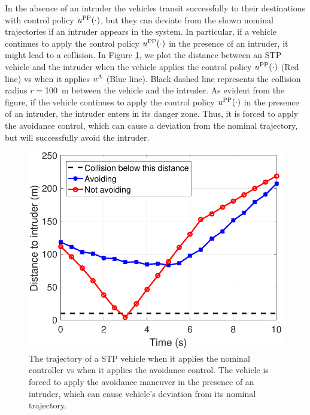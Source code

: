 In the absence of an intruder the vehicles transit successfully to their destinations with control policy $u^{\text{PP}}(\cdot)$, but they can deviate from the shown nominal trajectories if an intruder appears in the system. In particular, if a vehicle continues to apply the control policy $u^{\text{PP}}(\cdot)$ in the presence of an intruder, it might lead to a collision.
In Figure \ref{fig:trajComparison}, we plot the distance between an STP vehicle and the intruder when the vehicle applies the control policy $u^{\text{PP}}(\cdot)$ (Red line) vs when it applies ${u^{\text{A}}}$ (Blue line). Black dashed line represents the collision radius $r=$\SI{100}{\m} between the vehicle and the intruder. As evident from the figure, if the vehicle continues to apply the control policy $u^{\text{PP}}(\cdot)$ in the presence of an intruder, the intruder enters in its danger zone. Thus, it is forced to apply the avoidance control, which can cause a deviation from the nominal trajectory, but will successfully avoid the intruder.
\begin{figure}
  \centering
  \includegraphics[width=0.6\columnwidth]{figs/simulateIntruder}
  \caption{The trajectory of a STP vehicle when it applies the nominal controller vs when it applies the avoidance control. The vehicle is forced to apply the avoidance maneuver in the presence of an intruder, which can cause vehicle's deviation from its nominal trajectory.}
  \label{fig:trajComparison}
\end{figure}

